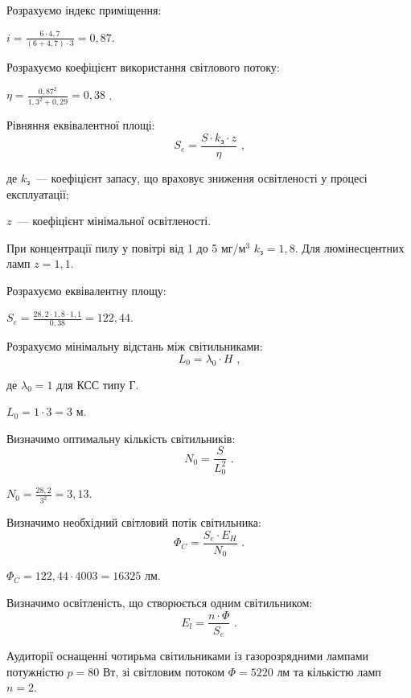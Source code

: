 \documentclass[a4paper,ukrainian,utf8,nocolumnsxix,nocolumnxxxii,nocolumnxxxi,floatsection,equationsection]{eskdtext}
\begin{document}
Розрахуємо індекс приміщення: 

$i = \frac{6 \cdot 4,7}{(6 + 4,7) \cdot 3} = 0,87 $.


Розрахуємо коефіцієнт використання світлового потоку:

$\eta = \frac{0,87^2}{1,3^2 + 0,29} = 0,38$ .


Рівняння еквівалентної площі:
\begin{equation}
	S_e = \frac{S \cdot k_\text{з} \cdot z}{\eta} \text{ ,}
\end{equation}

де $k_\text{з}$~--- коефіцієнт запасу, що враховує зниження освітленості у процесі експлуатації;

$z$~--- коефіцієнт мінімальної освітленості.


При концентрації пилу у повітрі від 1 до 5 мг/м$^3$ $k_\text{з} = 1,8$. Для люмінесцентних ламп $z = 1,1$.

Розрахуємо еквівалентну площу:

$S_e  = \frac{28,2 \cdot 1,8 \cdot 1,1}{0,38} = 122,44 $.


Розрахуємо мінімальну відстань між світильниками:
\begin{equation}
	L_0 = \lambda_0 \cdot H \text{ ,}
\end{equation}

де $\lambda_0 = 1$ для КСС типу Г. 

$L_0  = 1 \cdot 3 = 3\text{ м} $.


Визначимо оптимальну кількість світильників:
\begin{equation}
	N_0 = \frac{S}{L_0^2}  \text{ .}
\end{equation}

$N_0  = \frac{28,2}{3^2} = 3,13 $.


Визначимо необхідний світловий потік світильника:
\begin{equation}
	\Phi_C = \frac{S_e \cdot E_H}{N_0}  \text{ .}
\end{equation}

$\Phi_C  = {122,44 \cdot 400}{3} = 16325 \text{ лм} $.


Визначимо освітленість, що створюється одним світильником:
\begin{equation}
	E_l = \frac{n \cdot \Phi}{S_e} \text{ .}
\end{equation}

Аудиторії оснащенні чотирьма світильниками із газорозрядними лампами потужністю $p=80$ Вт, зі світловим потоком $\Phi=5220$ лм та кількістю ламп $n=2$.
\end{document}
